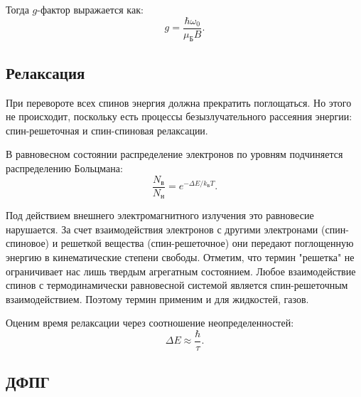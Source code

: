 \documentclass[a4paper, 12pt]{article} %
\begin{document}
	Тогда $g$-фактор выражается как:
	\begin{equation}
		g = \frac{\hbar \omega_0}{\mu_{\text{Б}} B}.
		\label{eq:g_factor}
	\end{equation}
	
	\subsection{Релаксация}
	При перевороте всех спинов энергия должна прекратить поглощаться. Но этого не происходит, поскольку есть процессы безызлучательного рассеяния энергии: спин-решеточная и спин-спиновая релаксации.
	
	В равновесном состоянии распределение электронов по уровням подчиняется распределению Больцмана:
	$$ \frac{N_{\text{в}}}{N_{\text{н}}} = e^{- \Delta E / k_{\text{Б}} T}. $$
	
	Под действием внешнего электромагнитного излучения это равновесие нарушается. За счет взаимодействия электронов с другими электронами (спин-спиновое) и решеткой вещества (спин-решеточное) они передают поглощенную энергию в кинематические степени свободы.
	Отметим, что термин "решетка" не ограничивает нас лишь твердым агрегатным состоянием. Любое взаимодействие спинов с термодинамически равновесной системой является спин-решеточным взаимодействием. Поэтому термин применим и для жидкостей, газов.
	
	Оценим время релаксации через соотношение неопределенностей:
	\begin{equation}
		\Delta E \approx \frac{\hbar}{\tau}.
		\label{eq:relaxation}
	\end{equation}
	
	\subsection{ДФПГ}
	
\end{document}
